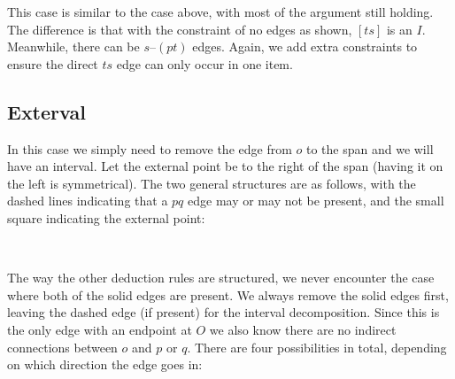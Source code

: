 This case is similar to the case above, with most of the argument still holding.
The difference is that with the constraint of no edges as shown, $[ts]$ is an $I$.
Meanwhile, there can be $s$--$(pt)$ edges.
Again, we add extra constraints to ensure the direct $ts$ edge can only occur in one item.


\subsection{Exterval}
In this case we simply need to remove the edge from $o$ to the span and we will have an interval.
Let the external point be to the right of the span (having it on the left is symmetrical).
The two general structures are as follows, with the dashed lines indicating that a $pq$ edge may or may not be present, and the small square indicating the external point:

\begin{center}
\\
\end{center}

The way the other deduction rules are structured, we never encounter the case where both of the solid edges are present.
We always remove the solid edges first, leaving the dashed edge (if present) for the interval decomposition.
Since this is the only edge with an endpoint at $O$ we also know there are no indirect connections between $o$ and $p$ or $q$.
There are four possibilities in total, depending on which direction the edge goes in:

